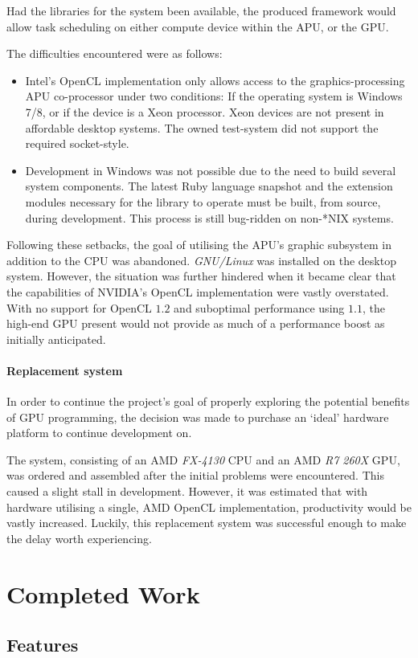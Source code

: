Had the libraries for the system been available, the produced framework would allow task scheduling on either compute device within the \ac{APU}, or the \ac{GPU}.

The difficulties encountered were as follows:
\begin{itemize}
  \item Intel's \ac{OpenCL} implementation only allows access to the graphics-processing \ac{APU} co-processor under two conditions: If the operating system is Windows 7/8, or if the device is a Xeon processor. Xeon devices are not present in affordable desktop systems. The owned test-system did not support the required socket-style.

  \item Development in Windows was not possible due to the need to build several system components. The latest Ruby language snapshot and the extension modules necessary for the library to operate must be built, from source, during development. This process is still bug-ridden on non-*NIX systems.
\end{itemize}

Following these setbacks, the goal of utilising the \ac{APU}'s graphic subsystem in addition to the \ac{CPU} was abandoned. \emph{GNU/Linux} was installed on the desktop system. However, the situation was further hindered when it became clear that the capabilities of NVIDIA's \ac{OpenCL} implementation were vastly overstated. With no support for \ac{OpenCL} $1.2$ and suboptimal performance using $1.1$, the high-end \ac{GPU} present would not provide as much of a performance boost as initially anticipated.

\paragraph*{Replacement system}
In order to continue the project's goal of properly exploring the potential benefits of \ac{GPU} programming, the decision was made to purchase an `ideal' hardware platform to continue development on.

The system, consisting of an \ac{AMD} \emph{FX-4130} CPU and an \ac{AMD} \emph{R7 260X} \ac{GPU}, was ordered and assembled after the initial problems were encountered. This caused a slight stall in development. However, it was estimated that with hardware utilising a single, \ac{AMD} \ac{OpenCL} implementation, productivity would be vastly increased. Luckily, this replacement system was successful enough to make the delay worth experiencing.

\section{Completed Work}
\subsection{Features}
